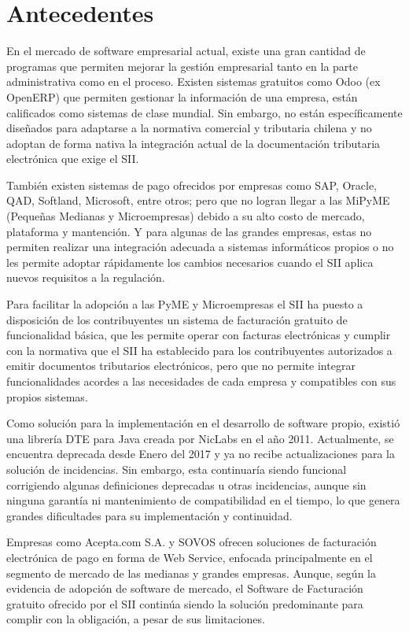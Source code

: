 \section{Antecedentes}

En el mercado de software empresarial actual, existe una gran cantidad de programas que permiten mejorar la gestión empresarial tanto en la parte administrativa como en el proceso. Existen sistemas gratuitos como Odoo (ex OpenERP) que permiten gestionar la información de una empresa, están calificados como sistemas  de clase mundial. Sin embargo, no están específicamente diseñados para adaptarse a la normativa comercial y tributaria chilena y no adoptan de forma nativa la integración actual de la documentación tributaria electrónica que exige el SII.

También existen sistemas de pago ofrecidos por empresas como SAP, Oracle, QAD, Softland, Microsoft, entre otros; pero que no logran llegar a las MiPyME (Pequeñas Medianas y Microempresas) debido a su alto costo de mercado, plataforma y mantención. Y para algunas de las grandes empresas, estas no permiten realizar una integración adecuada a sistemas informáticos propios o no les permite adoptar rápidamente los cambios necesarios cuando el SII aplica nuevos requisitos a la regulación.

Para facilitar la adopción a las PyME y Microempresas el SII ha puesto a disposición de los contribuyentes un sistema de facturación gratuito de funcionalidad básica, que les permite operar con facturas electrónicas y cumplir con la normativa que el SII ha establecido para los contribuyentes autorizados a emitir documentos tributarios electrónicos, pero que no permite integrar funcionalidades acordes a las necesidades de cada empresa y compatibles con sus propios sistemas.

Como solución para la implementación en el desarrollo de software propio, existió una librería DTE para Java creada por NicLabs en el año 2011. Actualmente, se encuentra deprecada desde Enero del 2017 y ya no recibe actualizaciones para la solución de incidencias. Sin embargo, esta continuaría siendo funcional corrigiendo algunas definiciones deprecadas u otras incidencias, aunque sin ninguna garantía ni mantenimiento de compatibilidad en el tiempo, lo que genera grandes dificultades para su implementación y continuidad.

Empresas como Acepta.com S.A. y SOVOS ofrecen soluciones de facturación electrónica de pago en forma de Web Service, enfocada principalmente en el segmento de mercado de las medianas y grandes empresas. Aunque, según la evidencia de adopción de software de mercado, el Software de Facturación gratuito ofrecido por el SII continúa siendo la solución predominante para complir con la obligación, a pesar de sus limitaciones.

